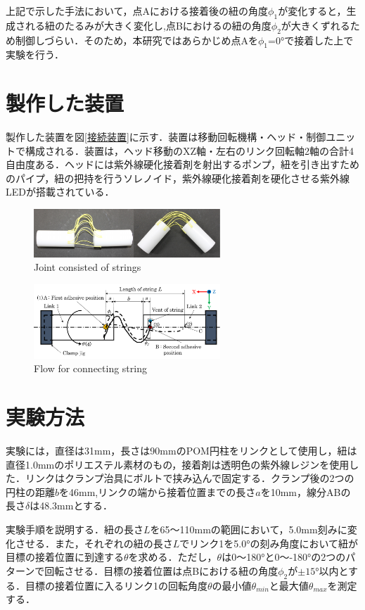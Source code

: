 上記で示した手法において，点Aにおける接着後の紐の角度$\phi_1$が変化すると，生成される紐のたるみが大きく変化し,点Bにおけるの紐の角度$\phi_2$が大きくずれるため制御しづらい．そのため，本研究ではあらかじめ点Aを$\phi_1$=0°で接着した上で実験を行う．


\section{製作した装置}
製作した装置を図\ref{接続装置}に示す．装置は移動回転機構・ヘッド・制御ユニットで構成される．装置は，ヘッド移動のXZ軸・左右のリンク回転軸2軸の合計4自由度ある．ヘッドには紫外線硬化接着剤を射出するポンプ，紐を引き出すためのパイプ，紐の把持を行うソレノイド，紫外線硬化接着剤を硬化させる紫外線LEDが搭載されている．


\begin{figure}[h]
  \centering
  \includegraphics[width=70mm]{figure/目指す紐関節}
  \caption{Joint consisted of strings}
  \label{紐関節}
\end{figure}
\begin{figure}[h]
  \centering
  \includegraphics[width=70mm]{figure/abst用製造手法}
  \caption{Flow for connecting string}
  \label{製造手法}
\end{figure}

\section{実験方法}
実験には，直径は31mm，長さは90mmのPOM円柱をリンクとして使用し，紐は直径1.0mmのポリエステル素材のもの，接着剤は透明色の紫外線レジンを使用した．リンクはクランプ治具にボルトで挟み込んで固定する．クランプ後の2つの円柱の距離$b$を46mm,リンクの端から接着位置までの長さ$a$を10mm，線分ABの長さ$\delta$は48.3mmとする．
\par
実験手順を説明する．紐の長さ$L$を65～110mmの範囲において，5.0mm刻みに変化させる．また，それぞれの紐の長さ$L$でリンク1を5.0°の刻み角度において紐が目標の接着位置に到達する$\theta$を求める．ただし，$\theta$は0～180°と0～-180°の2つのパターンで回転させる．目標の接着位置は点Bにおける紐の角度$\phi_2$が$\pm{15}$°以内とする．目標の接着位置に入るリンク1の回転角度$\theta$の最小値$\theta_{min}$と最大値$\theta_{max}$を測定する．

